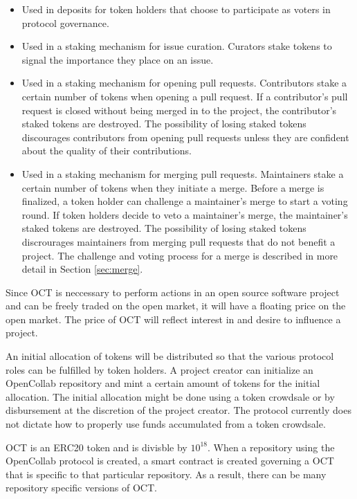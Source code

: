 \begin{itemize}
  \item Used in deposits for token holders that choose to participate as voters
    in protocol governance.
  \item Used in a staking mechanism for issue curation. Curators stake tokens to
    signal the importance they place on an issue.
  \item Used in a staking mechanism for opening pull requests. Contributors
    stake a certain number of tokens when opening a pull request. If a
    contributor's pull request is closed without being merged in to the project,
    the contributor's staked tokens are destroyed. The possibility of losing
    staked tokens discourages contributors from opening pull requests unless
    they are confident about the quality of their contributions.
  \item Used in a staking mechanism for merging pull requests. Maintainers stake
    a certain number of tokens when they initiate a merge. Before a merge is
    finalized, a token holder can challenge a maintainer's merge to start a
    voting round. If token holders decide to veto a maintainer's merge, the
    maintainer's staked tokens are destroyed. The possibility of losing staked
    tokens discrourages maintainers from merging pull requests that do not
    benefit a project. The challenge and voting process for a merge is described
    in more detail in Section \ref{sec:merge}.
\end{itemize}

Since OCT is neccessary to perform actions in an open source software project
and can be freely traded on the open market, it will have a floating price on
the open market. The price of OCT will reflect interest in and desire to
influence a project.

An initial allocation of tokens will be distributed so that the various protocol
roles can be fulfilled by token holders. A project creator can initialize an OpenCollab repository and mint a certain amount of
tokens for the initial allocation. The initial allocation might be done using a
token crowdsale or by disbursement at the discretion of the project creator. The
protocol currently does not dictate how to properly use funds accumulated from a
token crowdsale.

OCT is an ERC20 token and is divisble by $10^{18}$. When a
repository using the OpenCollab protocol is created, a smart contract is created
governing a OCT that is specific to that particular repository. As a result,
there can be many repository specific versions of OCT.

